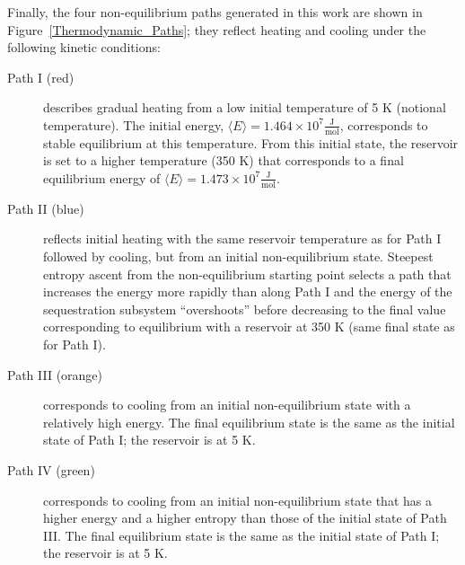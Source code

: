 \documentclass[
journal=jcisd8, %
manuscript=article,
layout=twocolumn   %
]{achemso}
\begin{document}

Finally, the four non-equilibrium paths generated in this work are shown in Figure~\ref{Thermodynamic_Paths}; they reflect heating and cooling under the following kinetic conditions:

\begin{description}
\item[Path I (red)] describes gradual heating from a low initial temperature of 5 K (notional temperature). The initial energy, $\langle E \rangle =1.464 \times 10^{7} \frac{\text{J}}{\text{mol}}$, corresponds to stable equilibrium at this temperature. From this initial state, the reservoir is set to a higher temperature (350 K) that corresponds to a final equilibrium energy of $\langle E \rangle =1.473 \times 10^{7} \frac{\text{J}}{\text{mol}}$. 

\item[Path II (blue)]
reflects initial heating  with the same reservoir temperature as for Path I followed by cooling, but from an initial non-equilibrium state. Steepest entropy ascent from the non-equilibrium starting point selects a path that increases the energy more rapidly than along Path I and the energy of the sequestration subsystem ``overshoots'' before decreasing to the final value corresponding to equilibrium with a reservoir at 350 K (same final state as for Path I).

\item[Path III (orange)]
corresponds to cooling from an initial non-equilibrium state with a relatively high energy. The final equilibrium state is the same as the initial state of Path I; the reservoir is at 5 K.

\item[Path IV (green)]
corresponds to cooling from an initial non-equilibrium state that has a higher energy and a higher entropy than those of the initial state of Path III. The final equilibrium state is the same as the initial state of Path I; the reservoir is at 5 K.
\end{description}
\end{document}
